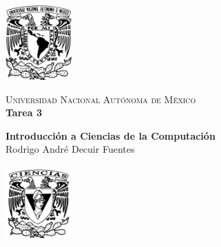 \documentclass{report}
\begin{document}
    \begin{minipage}[t]{0.165 \textwidth}
       \begin{flushright}
        \includegraphics[width=1in]{EscudoUNAM.png}
       \end{flushright}
    \end{minipage}
    \begin{minipage}[H]{0.62 \textwidth}
        \begin{center}
            {\large \textsc{Universidad Nacional Autónoma de México}}
            \vspace{0.25cm}
            \\
            { \huge \textbf{Tarea 3}}
            \\
            \vspace{0.25cm}
            
            \textbf{Introducción a Ciencias de la Computación}
	   		\\
	        \vspace{0.25cm}
	        Rodrigo André Decuir Fuentes
            \vspace{0.2cm}
        \end{center}
        \vspace{0.05cm}
    \end{minipage}
    \begin{minipage}[t]{0.165 \textwidth}
        \begin{flushleft}
            \includegraphics[width=1in]{Fciencias_UNAM.png}
        \end{flushleft}
    \end{minipage}
\end{document}
